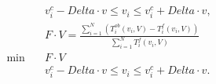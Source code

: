 \begin{align}
  & v_{i}^{c} - \mathit{Delta} \cdot v \leq v_{i} \leq v_{i}^{c} + \mathit{Delta} \cdot v , \tag{eq\_0001} \\
  & F \cdot V = \frac{\sum_{i = 1}^{N} \left(T_{i}^{\mathit{ob}} \left(v_{i} , V\right) - T_{i}^{f} \left(v_{i} , V\right)\right)}{\sum_{i = 1}^{N} T_{i}^{f} \left(v_{i} , V\right)} \tag{eq\_0002} \\
  \min\quad & F \cdot V \tag{eq\_0005\_a} \\
  & v_{i}^{c} - \mathit{Delta} \cdot v \leq v_{i} \leq v_{i}^{c} + \mathit{Delta} \cdot v . \tag{eq\_0005\_b} \\
\end{align}
